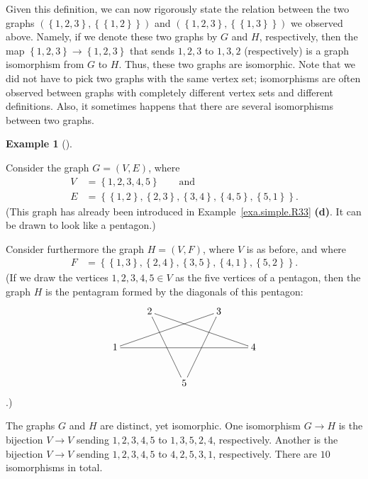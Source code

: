 \documentclass[numbers=enddot,12pt,final,onecolumn,notitlepage]{scrartcl}%
\makeatletter
\theoremstyle{definition}
\newtheorem{exam}[theo]{Example}
\newenvironment{example}[1][]
{\begin{exam}[#1]\begin{leftbar}}
{\end{leftbar}\end{exam}}
\newcommand{\set}[1]{\left\{ #1 \right\}}
\newcommand{\tup}[1]{\left( #1 \right)}
\newcommand{\are}{\ar@{-}}
\makeatother
\begin{document}
Given this definition, we can now rigorously state the relation
between the two graphs $\tup{\set{1,2,3},\set{\set{1,2}}}$ and
$\tup{\set{1,2,3},\set{\set{1,3}}}$ we observed above. Namely, if we
denote these two graphs by $G$ and $H$, respectively, then the map
$\set{1,2,3} \to \set{1,2,3}$ that sends $1,2,3$ to $1,3,2$
(respectively) is a graph isomorphism from $G$ to $H$. Thus, these two
graphs are isomorphic. Note that we did not have to pick two graphs
with the same vertex set; isomorphisms are often observed between
graphs with completely different vertex sets and different
definitions. Also, it sometimes happens that there are several
isomorphisms between two graphs.

\begin{example} \label{exa.intro.iso.pentagon}
Consider the graph $G = \tup{V, E}$, where
\begin{align*}
V &= \set{1, 2, 3, 4, 5} \qquad \text{and} \\
E &= \set{\set{1,2}, \set{2,3}, \set{3,4}, \set{4,5}, \set{5,1}} .
\end{align*}
(This graph has already been introduced in
Example~\ref{exa.simple.R33} \textbf{(d)}. It can be drawn to look
like a pentagon.)

Consider furthermore the graph $H = \tup{V, F}$, where $V$ is as
before, and where
\begin{align*}
F &= \set{\set{1,3}, \set{2,4}, \set{3,5}, \set{4,1}, \set{5,2}} .
\end{align*}
(If we draw the vertices $1,2,3,4,5 \in V$ as the five vertices of a
pentagon, then the graph $H$ is the pentagram formed by the diagonals
of this pentagon:
\begin{align*}
\xymatrix{
& 2 \are[rrrd] \are[rdd] & & 3 \are[llld] \are[ldd] \\
1 \are[rrrr] & & & & 4 \\
& & 5
}
\end{align*}
.)

The graphs $G$ and $H$ are distinct, yet isomorphic. One isomorphism
$G \to H$ is the bijection $V \to V$ sending $1,2,3,4,5$ to
$1,3,5,2,4$, respectively. Another is the bijection $V \to V$ sending
$1,2,3,4,5$ to $4,2,5,3,1$, respectively. There are $10$ isomorphisms
in total.
\end{example}
\end{document}
